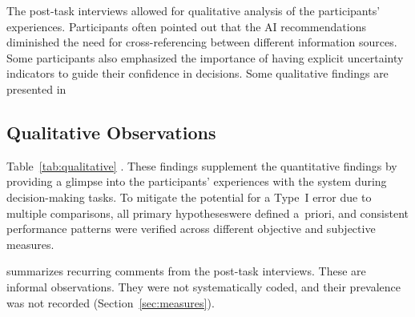 \documentclass[journal]{IEEEtran}
\theoremstyle{plain}
\theoremstyle{definition}
\providecommand{\DIFaddtex}[1]{{\protect\color{blue} \sf #1}} %
\providecommand{\DIFdeltex}[1]{{\protect\color{red} \scriptsize #1}} %
\providecommand{\DIFaddbegin}{} %
\providecommand{\DIFaddend}{} %
\providecommand{\DIFdelbegin}{} %
\providecommand{\DIFdelend}{} %
\providecommand{\DIFadd}[1]{\texorpdfstring{\DIFaddtex{#1}}{#1}} %
\providecommand{\DIFdel}[1]{\texorpdfstring{\DIFdeltex{#1}}{}} %
\newcommand{\DIFscaledelfig}{0.5}
\newlength{\DIFdelgraphicswidth} %
\newlength{\DIFdelgraphicsheight} %
\newcommand{\DIFaddincludegraphics}[2][]{{\color{blue}\fbox{\DIFOincludegraphics[#1]{#2}}}} %
\newcommand{\DIFdelincludegraphics}[2][]{%
\sbox{\DIFdelgraphicsbox}{\DIFOincludegraphics[#1]{#2}}%
\settoboxwidth{\DIFdelgraphicswidth}{\DIFdelgraphicsbox} %
\settoboxtotalheight{\DIFdelgraphicsheight}{\DIFdelgraphicsbox} %
\scalebox{\DIFscaledelfig}{%
\parbox[b]{\DIFdelgraphicswidth}{\usebox{\DIFdelgraphicsbox}\\[-\baselineskip] \rule{\DIFdelgraphicswidth}{0em}}\llap{\resizebox{\DIFdelgraphicswidth}{\DIFdelgraphicsheight}{%
\setlength{\unitlength}{\DIFdelgraphicswidth}%
\begin{picture}(1,1)%
\thicklines\linethickness{2pt} %
{\color[rgb]{1,0,0}\put(0,0){\framebox(1,1){}}}%
{\color[rgb]{1,0,0}\put(0,0){\line( 1,1){1}}}%
{\color[rgb]{1,0,0}\put(0,1){\line(1,-1){1}}}%
\end{picture}%
}\hspace*{3pt}}} %
} %
\DeclareRobustCommand{\DIFaddbegin}{\DIFOaddbegin \let\includegraphics\DIFaddincludegraphics} %
\DeclareRobustCommand{\DIFaddend}{\DIFOaddend \let\includegraphics\DIFOincludegraphics} %
\DeclareRobustCommand{\DIFdelbegin}{\DIFOdelbegin \let\includegraphics\DIFdelincludegraphics} %
\DeclareRobustCommand{\DIFdelend}{\DIFOaddend \let\includegraphics\DIFOincludegraphics} %
\begin{document}
    \DIFdelbegin \DIFdel{The post-task interviews allowed for qualitative analysis of the participants' experiences. Participants often pointed out that the AI recommendations diminished the need for cross-referencing between different information sources. Some participants also emphasized the importance of having explicit uncertainty indicators to guide their confidence in decisions. Some qualitative findings are presented in }\DIFdelend \DIFaddbegin \subsection{\DIFadd{Qualitative Observations}}
    \DIFaddend Table~\ref{tab:qualitative} \DIFdelbegin \DIFdel{. These findings supplement the quantitative findings by providing a glimpse into the participants' experiences with the system during decision-making tasks. To mitigate the potential for a Type~I error due to multiple comparisons, all primary hypotheseswere defined a~priori, and consistent performance patterns were verified across different objective and subjective measures. }%

\DIFdelend \DIFaddbegin \DIFadd{summarizes recurring comments from the post-task interviews. These are informal observations. They were not systematically coded, and their prevalence was not recorded (Section~\ref{sec:measures}).
}\DIFaddend 
\end{document}
